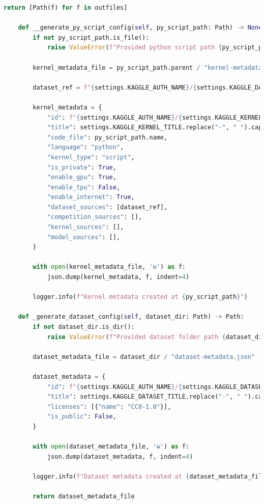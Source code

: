 \begin{lstlisting}[language=Python, numbers=none, frame=none]
        return [Path(f) for f in outfiles]

    def __generate_py_script_config(self, py_script_path: Path) -> None:
        if not py_script_path.is_file():
            raise ValueError(f"Provided python script path {py_script_path} is not a valid file.")

        kernel_metadata_file = py_script_path.parent / "kernel-metadata.json"

        dataset_ref = f"{settings.KAGGLE_AUTH_NAME}/{settings.KAGGLE_DATASET_TITLE}"

        kernel_metadata = {
            "id": f"{settings.KAGGLE_AUTH_NAME}/{settings.KAGGLE_KERNEL_TITLE}",
            "title": settings.KAGGLE_KERNEL_TITLE.replace("-", " ").capitalize(),
            "code_file": py_script_path.name,
            "language": "python",
            "kernel_type": "script",
            "is_private": True,
            "enable_gpu": True,
            "enable_tpu": False,
            "enable_internet": True,
            "dataset_sources": [dataset_ref],
            "competition_sources": [],
            "kernel_sources": [],
            "model_sources": [],
        }

        with open(kernel_metadata_file, 'w') as f:
            json.dump(kernel_metadata, f, indent=4)

        logger.info(f"Kernel metadata created at {py_script_path}")

    def _generate_dataset_config(self, dataset_dir: Path) -> Path:
        if not dataset_dir.is_dir():
            raise ValueError(f"Provided dataset folder path {dataset_dir} is not a valid directory.")

        dataset_metadata_file = dataset_dir / "dataset-metadata.json"

        dataset_metadata = {
            "id": f"{settings.KAGGLE_AUTH_NAME}/{settings.KAGGLE_DATASET_TITLE}",
            "title": settings.KAGGLE_DATASET_TITLE.replace("-", " ").capitalize(),
            "licenses": [{"name": "CC0-1.0"}],
            "is_public": False,
        }

        with open(dataset_metadata_file, 'w') as f:
            json.dump(dataset_metadata, f, indent=4)

        logger.info(f"Dataset metadata created at {dataset_metadata_file}")

        return dataset_metadata_file
\end{lstlisting}

